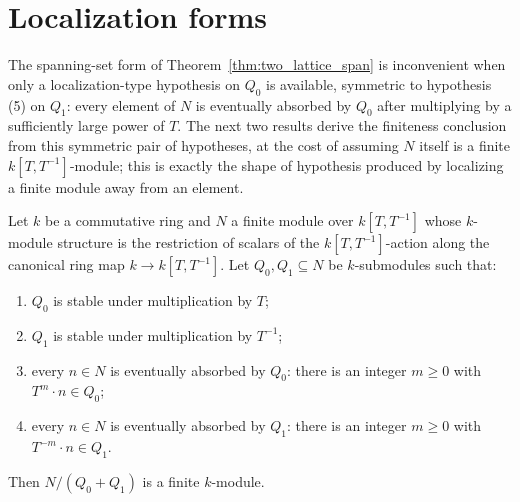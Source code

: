 \section{Localization forms}

The spanning-set form of Theorem~\ref{thm:two_lattice_span} is inconvenient when only a
localization-type hypothesis on \(Q_0\) is available, symmetric to hypothesis (5) on \(Q_1\):
every element of \(N\) is eventually absorbed by \(Q_0\) after multiplying by a sufficiently
large power of \(T\). The next two results derive the finiteness conclusion from this
symmetric pair of hypotheses, at the cost of assuming \(N\) itself is a finite
\(k[T,T^{-1}]\)-module; this is exactly the shape of hypothesis produced by localizing a
finite module away from an element.

\begin{corollary}
  \label{cor:two_lattice_loc}
  \leanok
  Let \(k\) be a commutative ring and \(N\) a finite module over \(k[T,T^{-1}]\) whose
  \(k\)-module structure is the restriction of scalars of the \(k[T,T^{-1}]\)-action along the
  canonical ring map \(k \to k[T,T^{-1}]\). Let \(Q_0, Q_1 \subseteq N\) be \(k\)-submodules
  such that:
  \begin{enumerate}
    \item \(Q_0\) is stable under multiplication by \(T\);
    \item \(Q_1\) is stable under multiplication by \(T^{-1}\);
    \item every \(n \in N\) is eventually absorbed by \(Q_0\): there is an integer \(m \ge 0\)
      with \(T^m \cdot n \in Q_0\);
    \item every \(n \in N\) is eventually absorbed by \(Q_1\): there is an integer \(m \ge 0\)
      with \(T^{-m} \cdot n \in Q_1\).
  \end{enumerate}
  Then \(N / (Q_0 + Q_1)\) is a finite \(k\)-module.
\end{corollary}
